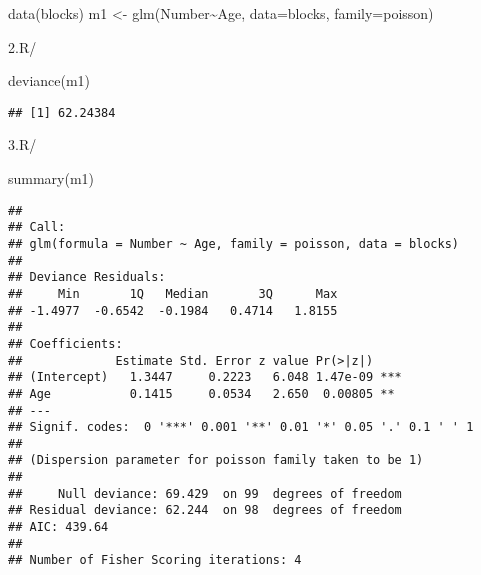\documentclass[
]{article}
\newenvironment{Shaded}{\begin{snugshade}}{\end{snugshade}}
\newcommand{\AttributeTok}[1]{\textcolor[rgb]{0.77,0.63,0.00}{#1}}
\newcommand{\FunctionTok}[1]{\textcolor[rgb]{0.00,0.00,0.00}{#1}}
\newcommand{\NormalTok}[1]{#1}
\newcommand{\OtherTok}[1]{\textcolor[rgb]{0.56,0.35,0.01}{#1}}
\newcommand{\SpecialCharTok}[1]{\textcolor[rgb]{0.00,0.00,0.00}{#1}}
\begin{document}
\begin{Shaded}
\begin{Highlighting}[]
\FunctionTok{data}\NormalTok{(blocks)}
\NormalTok{ m1 }\OtherTok{\textless{}{-}} \FunctionTok{glm}\NormalTok{(Number}\SpecialCharTok{\textasciitilde{}}\NormalTok{Age, }\AttributeTok{data=}\NormalTok{blocks, }\AttributeTok{family=}\NormalTok{poisson)}
\end{Highlighting}
\end{Shaded}

2.R/

\begin{Shaded}
\begin{Highlighting}[]
\FunctionTok{deviance}\NormalTok{(m1)}
\end{Highlighting}
\end{Shaded}

\begin{verbatim}
## [1] 62.24384
\end{verbatim}

3.R/

\begin{Shaded}
\begin{Highlighting}[]
\FunctionTok{summary}\NormalTok{(m1)}
\end{Highlighting}
\end{Shaded}

\begin{verbatim}
## 
## Call:
## glm(formula = Number ~ Age, family = poisson, data = blocks)
## 
## Deviance Residuals: 
##     Min       1Q   Median       3Q      Max  
## -1.4977  -0.6542  -0.1984   0.4714   1.8155  
## 
## Coefficients:
##             Estimate Std. Error z value Pr(>|z|)    
## (Intercept)   1.3447     0.2223   6.048 1.47e-09 ***
## Age           0.1415     0.0534   2.650  0.00805 ** 
## ---
## Signif. codes:  0 '***' 0.001 '**' 0.01 '*' 0.05 '.' 0.1 ' ' 1
## 
## (Dispersion parameter for poisson family taken to be 1)
## 
##     Null deviance: 69.429  on 99  degrees of freedom
## Residual deviance: 62.244  on 98  degrees of freedom
## AIC: 439.64
## 
## Number of Fisher Scoring iterations: 4
\end{verbatim}

\begin{Shaded}
\end{Shaded}
\end{document}
